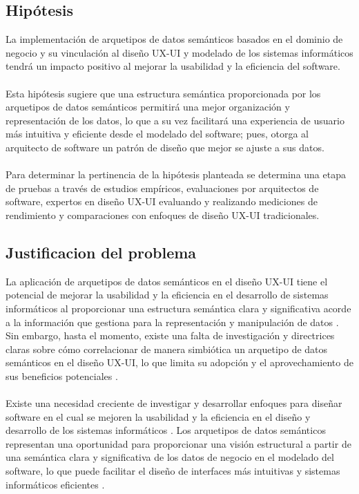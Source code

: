 \documentclass[12pt,a4paper]{article}
\begin{document}
\subsection{Hipótesis}
\label{sec:2a}
La implementación de arquetipos de datos semánticos basados en el dominio de negocio y su vinculación al diseño UX-UI y modelado de los sistemas informáticos tendrá un impacto positivo al mejorar la usabilidad y la eficiencia del software.
\\\\
Esta hipótesis sugiere que una estructura semántica proporcionada por los arquetipos de datos semánticos permitirá una mejor organización y representación de los datos, lo que a su vez facilitará una experiencia de usuario más intuitiva y eficiente desde el modelado del software; pues, otorga al arquitecto de software un patrón de diseño que mejor se ajuste a sus datos. 
\\\\
Para determinar la pertinencia de la hipótesis planteada se determina una etapa de pruebas a través de estudios empíricos, evaluaciones por arquitectos de software, expertos en diseño UX-UI evaluando y realizando mediciones de rendimiento y comparaciones con enfoques de diseño UX-UI tradicionales.

\subsection{Justificacion del problema}
\label{sec:3}
La aplicación de arquetipos de datos semánticos en el diseño UX-UI tiene el potencial de mejorar la usabilidad y la eficiencia en el desarrollo de sistemas informáticos al proporcionar una estructura semántica clara y significativa acorde a la información que gestiona para la representación y manipulación de datos
\cite{Stacey2017}
\cite{Marco-Ruiz2015a}
. Sin embargo, hasta el momento, existe una falta de investigación y directrices claras sobre cómo correlacionar de manera simbiótica un arquetipo de datos semánticos en el diseño UX-UI, lo que limita su adopción y el aprovechamiento de sus beneficios potenciales
\cite{Qanbari2016}
.
\\\\
Existe una necesidad creciente de investigar y desarrollar enfoques para diseñar software en el cual se mejoren la usabilidad y la eficiencia en el diseño y desarrollo de los sistemas informáticos
\cite{Spath2011}
\cite{Esposito201610}
\cite{Feras2022}
. Los arquetipos de datos semánticos representan una oportunidad para proporcionar una visión estructural a partir de una semántica clara y significativa de los datos de negocio en el modelado del software, lo que puede facilitar el diseño de interfaces más intuitivas y sistemas informáticos eficientes
\cite{Stacey2017}
\cite{Catalina2008}
\cite{Sari2012}
.
\end{document}
